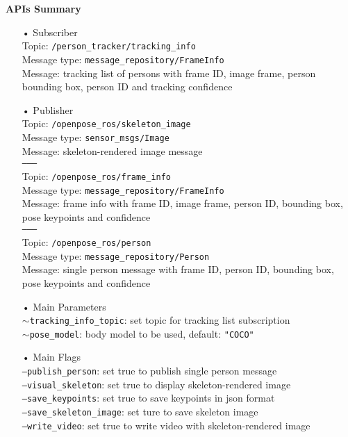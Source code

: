 \textbf{APIs Summary}

\begin{itemize}
\item[•] Subscriber \\
Topic: \texttt{/person\_tracker/tracking\_info} \\
Message type: \texttt{message\_repository/FrameInfo} \\
Message: tracking list of persons with frame ID, image frame, person bounding box, person ID and tracking confidence

\item[•] Publisher \\
Topic: \texttt{/openpose\_ros/skeleton\_image} \\
Message type: \texttt{sensor\_msgs/Image} \\
Message: skeleton-rendered image message \\
\texttt{--------} \\
Topic: \texttt{/openpose\_ros/frame\_info} \\
Message type: \texttt{message\_repository/FrameInfo} \\
Message: frame info with frame ID, image frame, person ID, bounding box, pose keypoints and confidence \\
\texttt{--------} \\
Topic: \texttt{/openpose\_ros/person} \\
Message type: \texttt{message\_repository/Person} \\
Message: single person message with frame ID, person ID, bounding box, pose keypoints and confidence

\item[•] Main Parameters \\
\texttt{$\sim$tracking\_info\_topic}: set topic for tracking list subscription \\
\texttt{$\sim$pose\_model}: body model to be used, default: \texttt{"COCO"}

\item[•] Main Flags \\ 
\texttt{---publish\_person}: set true to publish single person message \\
\texttt{---visual\_skeleton}: set true to display skeleton-rendered image \\
\texttt{---save\_keypoints}: set true to save keypoints in json format \\
\texttt{---save\_skeleton\_image}: set ture to save skeleton image \\
\texttt{---write\_video}: set true to write video with skeleton-rendered image 
\end{itemize}


